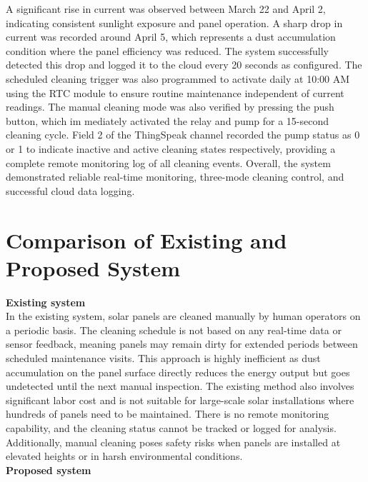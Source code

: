 \documentclass[10pt]{report}
\begin{document}
\begin{sloppypar}
{{{\begin{sloppypar}
A significant rise in current was observed between
March 22 and April 2, indicating consistent sunlight exposure and panel operation.
A sharp drop in current was recorded around April 5, which represents a dust accumulation condition where the panel efficiency was reduced. The system successfully
detected this drop and logged it to the cloud every 20 seconds as configured. The
scheduled cleaning trigger was also programmed to activate daily at 10:00 AM using the RTC module to ensure routine maintenance independent of current readings.
The manual cleaning mode was also verified by pressing the push button, which im
mediately activated the relay and pump for a 15-second cleaning cycle. Field 2 of
the ThingSpeak channel recorded the pump status as 0 or 1 to indicate inactive and
active cleaning states respectively, providing a complete remote monitoring log of
all cleaning events. Overall, the system demonstrated reliable real-time monitoring,
three-mode cleaning control, and successful cloud data logging. 


\section{Comparison of Existing and Proposed System}


\textbf{Existing system}\hspace{0.5cm}\\ 


In the existing system, solar panels are cleaned manually by human operators on a
periodic basis. The cleaning schedule is not based on any real-time data or sensor
feedback, meaning panels may remain dirty for extended periods between scheduled
maintenance visits. This approach is highly inefficient as dust accumulation on the
panel surface directly reduces the energy output but goes undetected until the next
manual inspection. The existing method also involves significant labor cost and is
not suitable for large-scale solar installations where hundreds of panels need to be
maintained. There is no remote monitoring capability, and the cleaning status cannot
be tracked or logged for analysis. Additionally, manual cleaning poses safety risks
when panels are installed at elevated heights or in harsh environmental conditions.\\

\textbf{Proposed system}\\


\end{sloppypar}}}}
\end{sloppypar}
\end{document}
